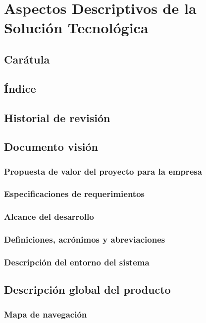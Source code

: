 

\section{Aspectos Descriptivos de la Solución Tecnológica}

\subsection{Carátula}
\subsection{Índice}
\subsection{Historial de revisión}
\subsection{Documento visión}
\subsubsection{Propuesta de valor del proyecto para la empresa}
\subsubsection{Especificaciones de requerimientos}
\subsubsection{Alcance del desarrollo}
\subsubsection{Definiciones, acrónimos y abreviaciones}
\subsubsection{Descripción del entorno del sistema}

\subsection{Descripción global del producto}
\subsubsection{Mapa de navegación}
